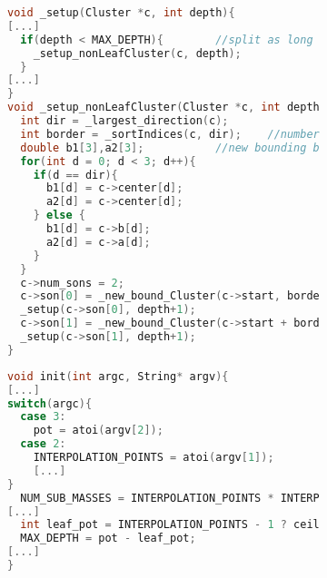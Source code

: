 \begin{figure}[t]
\begin{subfigure}{0.9\textwidth}
\begin{lstlisting}[language=C, label=lst:setup, 
		    caption={Dies sind die Kernmethoden der Konstruktion des Clusterbaumes. Die Teilung der bounding box wird hier vorgenommen
		    sowie die Sortierung der Elemente und Konstruktion der Sohncluster gestartet.}]
void _setup(Cluster *c, int depth){
[...]
  if(depth < MAX_DEPTH){		//split as long as condition is not met
    _setup_nonLeafCluster(c, depth);
  }
[...]
}
void _setup_nonLeafCluster(Cluster *c, int depth){
  int dir = _largest_direction(c);		
  int border = _sortIndices(c, dir);	//number of elements in the first son cluster
  double b1[3],a2[3];			//new bounding box points
  for(int d = 0; d < 3; d++){
    if(d == dir){
      b1[d] = c->center[d];
      a2[d] = c->center[d];
    } else {
      b1[d] = c->b[d];
      a2[d] = c->a[d];
    }
  }
  c->num_sons = 2;
  c->son[0] = _new_bound_Cluster(c->start, border, c->bodies, c->a, b1);
  _setup(c->son[0], depth+1);
  c->son[1] = _new_bound_Cluster(c->start + border, c->n - border, c->bodies, a2, c->b);
  _setup(c->son[1], depth+1);
}
\end{lstlisting}
\end{subfigure}
\end{figure}

\begin{figure}[t]
\begin{subfigure}{0.9\textwidth}
\begin{lstlisting}[language=C, label=lst:init, caption={Hier wird der Wert \code{MAX\_DEPTH} für die Abbruchbedingung berechnet.}]
void init(int argc, String* argv){
[...]
switch(argc){
  case 3:
    pot = atoi(argv[2]);
  case 2:
    INTERPOLATION_POINTS = atoi(argv[1]);
    [...]
}
  NUM_SUB_MASSES = INTERPOLATION_POINTS * INTERPOLATION_POINTS * INTERPOLATION_POINTS;
[...]
  int leaf_pot = INTERPOLATION_POINTS - 1 ? ceil(log2(2 * NUM_SUB_MASSES)) : 4;
  MAX_DEPTH = pot - leaf_pot;
[...]
}
\end{lstlisting}
\end{subfigure}
\end{figure}

